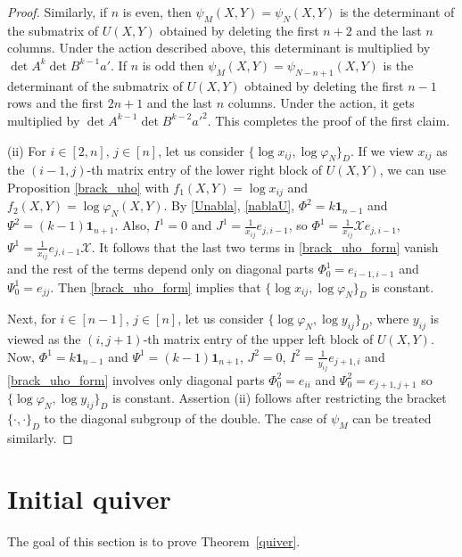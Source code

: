 \documentclass{amsart}
\theoremstyle{definition}
\theoremstyle{remark}
\numberwithin{equation}{section}
\numberwithin{theorem}{section}
\begin{document}
\begin{proof}
Similarly, if $n$ is even, then ${{\psi}}_M(X,Y)= {{\psi}}_N(X,Y)$ is the determinant of the 
submatrix of $U(X,Y)$ obtained by deleting the first $n+2$ and the last $n$ columns. Under the action 
described above, this determinant is multiplied by
$\det A^{k} \det B^{k-1} a'$. If $n$ is odd then   ${{\psi}}_M(X,Y)= {{\psi}}_{N-n+1}(X,Y)$ 
is the determinant of the  submatrix of $U(X,Y)$ obtained by deleting the first 
$n-1$ rows and the first $2n+1$ and the last $n$ columns.
Under the action, it gets multiplied by $\det A^{k-1} \det B^{k-2}a'^2$. 
This completes the proof of the first claim.

(ii) For $i\in [2,n]$, $j\in [n]$, let us consider $\{\log x_{ij}, \log {{\varphi}}_N\}_D$. 
If we view $x_{ij}$ as the $(i-1,j)$-th matrix entry of the lower right block
of $U(X,Y)$, we can use Proposition \ref{brack_uho} with $f_1(X,Y)=\log  x_{ij}$ and 
$f_2(X,Y)=\log {{\varphi}}_N(X,Y)$. By \eqref{Unabla}, \eqref{nablaU}, ${\Phi}^2 = k {\mathbf 1}_{n-1}$ and 
${\Psi}^2 = (k-1) {\mathbf 1}_{n+1}$. Also, $I^1=0$ and $J^1=\frac {1} {x_{ij}} e_{j,i-1}$,
 so ${\Phi}^1 = \frac {1} {x_{ij} }{{\mathcal X}} e_{j,i-1}$, ${\Psi}^1 = \frac {1} {x_{ij} }e_{j,i-1} {{\mathcal X}}$. 
 It follows that the last two terms in \eqref{brack_uho_form} vanish and the rest of the terms 
 depend only on diagonal parts ${\Phi}^1_0=e_{i-1,i-1}$ and ${\Psi}^1_0 =  e_{jj}$. 
 Then \eqref{brack_uho_form} implies that $\{\log x_{ij}, \log {{\varphi}}_N\}_D$ is constant. 

Next, for $i\in [n-1]$, $j\in [n]$, let us consider $\{ \log {{\varphi}}_N, \log y_{ij}\}_D$, 
where $y_{ij}$ is viewed as the $(i,j+1)$-th matrix entry of the upper left block
of $U(X,Y)$. Now, ${\Phi}^1 = k {\mathbf 1}_{n-1}$ and ${\Psi}^1 = (k-1) {\mathbf 1}_{n+1}$, $J^2 = 0$, 
$I^2 = \frac {1} {y_{ij}} e_{j+1,i}$ and
\eqref{brack_uho_form} involves only diagonal parts ${\Phi}^2_0= e_{ii}$ and ${\Psi}^2_0= e_{j+1, j+1}$ 
so $\{ \log {{\varphi}}_N, \log y_{ij}\}_D$ is constant. Assertion (ii) follows after restricting the bracket 
${{\{\cdot,\cdot\}}}_D$ to the diagonal subgroup of the double. The case of ${{\psi}}_M$ can be treated similarly.
\end{proof}

\section{Initial quiver}
The goal of this section is to prove Theorem~\ref{quiver}.
\end{document}
